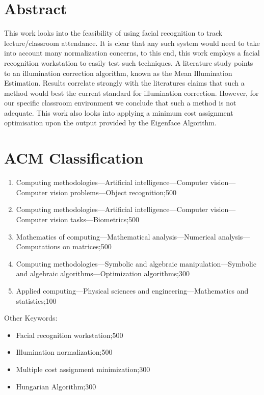 \documentclass{newrucsthesis}
\begin{document}
	\onehalfspacing
	

	\section*{Abstract}
		This work looks into the feasibility of using facial recognition to track lecture/classroom 
		attendance.  It is clear that any such system would need to take into account many normalization 
		concerns, to this end, this work employs a facial recognition workstation to easily test such 
		techniques.  A literature study points to an illumination correction algorithm, known as the Mean
		Illumination Estimation.  Results correlate strongly with the literatures claims that such a method 
		would best the current standard for illumination correction.  However, for our specific classroom 
		environment	we conclude that such a method is not adequate.  This work also looks into applying a 
		minimum cost assignment optimisation upon the output provided by the Eigenface Algorithm.
	
		\newpage
	
	\section*{ACM Classification}
		\begin{enumerate}
			\item Computing methodologies---Artificial intelligence---Computer vision---Computer vision problems---Object recognition;500
			\item Computing methodologies---Artificial intelligence---Computer vision---Computer vision tasks---Biometrics;500
			\item Mathematics of computing---Mathematical analysis---Numerical analysis---Computations on matrices;500
			\item Computing methodologies---Symbolic and algebraic manipulation---Symbolic and algebraic algorithms---Optimization algorithms;300
			\item Applied computing---Physical sciences and engineering---Mathematics and statistics;100
		\end{enumerate}
		Other Keywords:
		\begin{itemize}	
			\item Facial recognition workstation;500
			\item Illumination normalization;500
			\item Multiple cost assignment minimization;300
			\item Hungarian Algorithm;300
		\end{itemize}
		\newpage
	
\end{document}
